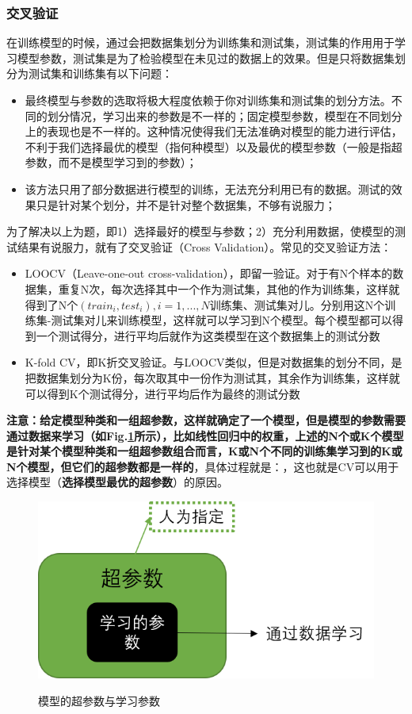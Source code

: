 \subsubsection{交叉验证}
在训练模型的时候，通过会把数据集划分为训练集和测试集，测试集的作用用于学习模型参数，测试集是为了检验模型在未见过的数据上的效果。但是只将数据集划分为测试集和训练集有以下问题：
\begin{itemize}
	\item 最终模型与参数的选取将极大程度依赖于你对训练集和测试集的划分方法。不同的划分情况，学习出来的参数是不一样的；固定模型参数，模型在不同划分上的表现也是不一样的。这种情况使得我们无法准确对模型的能力进行评估，不利于我们选择最优的模型（指何种模型）以及最优的模型参数（一般是指超参数，而不是模型学习到的参数）；
	\item 该方法只用了部分数据进行模型的训练，无法充分利用已有的数据。测试的效果只是针对某个划分，并不是针对整个数据集，不够有说服力；
\end{itemize}
为了解决以上为题，即1）选择最好的模型与参数；2）充分利用数据，使模型的测试结果有说服力，就有了交叉验证（Cross Validation）。常见的交叉验证方法：
\begin{itemize}
	\item LOOCV（Leave-one-out cross-validation），即留一验证。对于有N个样本的数据集，重复N次，每次选择其中一个作为测试集，其他的作为训练集，这样就得到了N个$(train_i, test_i), i = 1, ..., N$训练集、测试集对儿。分别用这N个训练集-测试集对儿来训练模型，这样就可以学习到N个模型。每个模型都可以得到一个测试得分，进行平均后就作为这类模型在这个数据集上的测试分数
	
	\item K-fold CV，即K折交叉验证。与LOOCV类似，但是对数据集的划分不同，是把数据集划分为K份，每次取其中一份作为测试其，其余作为训练集，这样就可以得到K个测试得分，进行平均后作为最终的测试分数
\end{itemize}
\textbf{注意：给定模型种类和一组超参数，这样就确定了一个模型，但是模型的参数需要通过数据来学习（如Fig.\ref{fig:model}所示），比如线性回归中的权重，上述的N个或K个模型是针对某个模型种类和一组超参数组合而言，K或N个不同的训练集学习到的K或N个模型，但它们的超参数都是一样的}，具体过程就是：，这也就是CV可以用于选择模型（\textbf{选择模型最优的超参数}）的原因。

\begin{figure}[h]
	\centering
	\includegraphics[width=.5\textwidth]{pics/model.png}
	\label{fig:model}
	\caption{模型的超参数与学习参数}
\end{figure}

